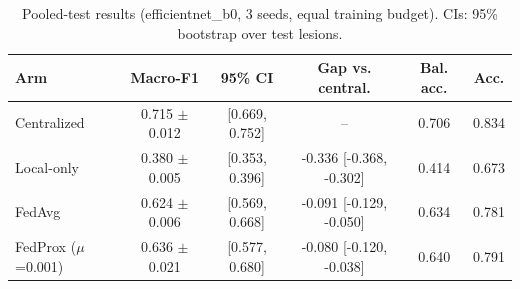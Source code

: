 \begin{table}[t]
\caption{Pooled-test results (efficientnet_b0, 3 seeds, equal training budget). CIs: 95\% bootstrap over test lesions.}
\label{tab:main_results}
\centering
\footnotesize
\setlength{\tabcolsep}{3pt}
\begin{tabular}{lccccc}
\hline
Arm & Macro-F1 & 95\% CI & Gap vs. central. & Bal. acc. & Acc. \\
\hline
Centralized & 0.715 $\pm$ 0.012 & [0.669, 0.752] & -- & 0.706 & 0.834 \\
Local-only & 0.380 $\pm$ 0.005 & [0.353, 0.396] & -0.336 [-0.368, -0.302] & 0.414 & 0.673 \\
FedAvg & 0.624 $\pm$ 0.006 & [0.569, 0.668] & -0.091 [-0.129, -0.050] & 0.634 & 0.781 \\
FedProx ($\mu$=0.001) & 0.636 $\pm$ 0.021 & [0.577, 0.680] & -0.080 [-0.120, -0.038] & 0.640 & 0.791 \\
\hline
\end{tabular}
\end{table}
